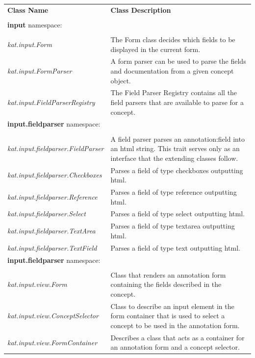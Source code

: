 \documentclass[a4paper, 12pt, notitlepage]{report}
\begin{document}
\newpage
\begin{tabular}{p{6cm} | p{8cm} }
 \large{\textbf{Class Name}} & \large{\textbf{Class Description}}\\ \\ \hline
 \textbf{input} namespace: \\\\ \hline
 \textit{kat.input.Form} & The Form class decides which fields to be displayed in the current form. \\ \hline
 \textit{kat.input.FormParser} & A form parser can be used to parse the fields and documentation from a given concept object.\\ \hline
 \textit{kat.input.FieldParserRegistry} & The Field Parser Registry contains all the field parsers that are available to parse for a concept.\\ \hline
 \textbf{input.fieldparser} namespace: \\\\ \hline
 \textit{kat.input.fieldparser.FieldParser} & A field parser parses an annotation:field into an html string. This trait serves only as an interface that the extending classes follow. \\ \hline
 \textit{kat.input.fieldparser.Checkboxes} & Parses a field of type checkboxes outputting html. \\ \hline
 \textit{kat.input.fieldparser.Reference} & Parses a field of type reference outputting html. \\ \hline
 \textit{kat.input.fieldparser.Select} & Parses a field of type select outputting html. \\ \hline
 \textit{kat.input.fieldparser.TextArea} & Parses a field of type textarea outputting html. \\ \hline
 \textit{kat.input.fieldparser.TextField} & Parses a field of type text outputting html. \\ \hline
 \textbf{input.fieldparser} namespace: \\\\ \hline
 \textit{kat.input.view.Form} & Class that renders an annotation form containing the fields described in the concept. \\ \hline
 \textit{kat.input.view.ConceptSelector} & Class to describe an input element in the form container that is used to select a concept to be used in the annotation form.\\ \hline
 \textit{kat.input.view.FormContainer} & Describes a class that acts as a container for an annotation form and a concept selector.\\ \hline 

\end{tabular}
\end{document}
